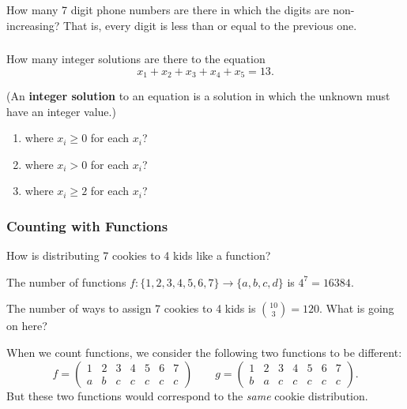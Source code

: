 \documentclass[11pt, compress]{beamer}
\newcommand{\amp}{&}
\newcommand{\terminology}[1]{\textbf{#1}}
\newcommand{\twoline}[2]{\begin{pmatrix}#1 \\ #2 \end{pmatrix}}
\begin{document}
\begin{frame}
\frametitle{}
\begin{example}[1.5.2]How many 7 digit phone numbers are there in which the digits are non-increasing? That is, every digit is less than or equal to the previous one.
\end{example}
\end{frame}
 
\begin{frame}
\frametitle{}
\begin{example}[1.5.3]How many integer solutions are there to the equation%
\begin{equation*}
x_1 + x_2 + x_3 + x_4 + x_5 = 13\text{.}
\end{equation*}

(An \terminology{integer solution} to an equation is a solution in which the unknown must have an integer value.)
\begin{enumerate}
\item{} where \(x_i \ge 0\) for each \(x_i\)?


\item{} where \(x_i > 0\) for each \(x_i\)?


\item{} where \(x_i \ge 2\) for each \(x_i\)?

\end{enumerate}

\end{example}
\end{frame}
 
\begin{frame}
\frametitle{Counting with Functions}
 How is distributing 7 cookies to 4 kids like a function?
 
\pause \vfill 

The number of functions \(f: \{1,2,3,4,5,6,7\} \to \{a,b,c,d\}\) is \(4^7 = 16384\).
 
\pause \vfill 

The number of ways to assign 7 cookies to 4 kids is \({10 \choose 3} = 120\). What is going on here?
 
\pause \vfill 

When we count functions, we consider the following two functions to be different:%
\begin{equation*}
f = \twoline{1 \amp 2 \amp 3 \amp 4\amp 5 \amp 6 \amp 7}{a \amp b \amp c \amp c \amp c \amp c \amp c} \qquad g = \twoline{1 \amp 2 \amp 3 \amp 4\amp 5 \amp 6 \amp 7}{b \amp a \amp c \amp c \amp c \amp c \amp c}\text{.}
\end{equation*}
But these two functions would correspond to the \emph{same} cookie distribution.
\end{frame}
 
\end{document}
